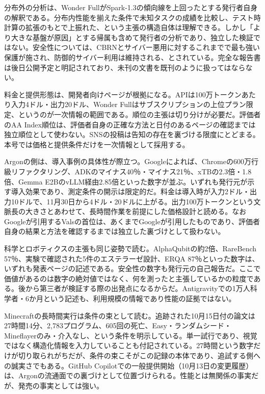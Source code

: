 \documentclass[lualatex,a4paper,10pt]{jlreq}
\begin{document}
分布外の分析は、Wonder FullがSpark-1.3の傾向線を上回ったとする発行者自身の解釈である。分布内性能を揃えた条件で未知タスクの成績を比較し、テスト時計算の拡張のもとで上振れた、という主張の構造自体は理解できる。しかし「より大きな基盤が原因」とする帰属も含めて発行者の分析であり、独立した検証ではない。安全性については、CBRNとサイバー悪用に対するこれまでで最も強い保護が施され、防御的サイバー利用は維持される、とされている。完全な報告書は後日公開予定と明記されており、未刊の文書を既刊のように扱ってはならない。

料金と提供形態は、開発者向けページが根拠になる。APIは100万トークンあたり入力4ドル・出力20ドル、Wonder Fullはサブスクリプションの上位プラン限定、というのが一次情報の範囲である。順位の主張は切り分けが必要だ。評価者のAA Index順位は、評価者自身の正確な方法と日付のあるページの確認までは独立順位として使わない。SNSの投稿は告知の存在を裏づける限度にとどまる。本号では価格と提供条件だけを一次情報として採用する。

Argonの側は、導入事例の具体性が際立つ。Googleによれば、Chromeの600万行級リファクタリング、ADKのマイナス40％・マイナス21％、xTBの2.3倍・1.8倍、Gemma E2BのvLLM経由2.85倍といった数字が並ぶ。いずれも発行元が示す導入効果であり、測定条件の開示は限定的だ。料金は導入時が入力2ドル・出力10ドルで、11月30日から4ドル・20ドルに上がる。出力100万トークンという文脈長の大きさとあわせて、長時間作業を前提にした価格設計と読める。なおGoogleが引用するValsの首位は、あくまでGoogleが引用したものであり、評価者自身の結果と方法を確認するまでは独立した裏づけとして扱わない。

科学とロボティクスの主張も同じ姿勢で読む。AlphaQubitの約2倍、RareBench 57％、実験で確認された5件のエステラーゼ設計、ERQA 87％といった数字は、いずれも発表ページの記述である。安全性の数字も発行元の自己報告だ。ここで価値があるのは数字の絶対値ではなく、何を測ったと主張しているかの粒度である。後から第三者が検証する際の出発点になるからだ。Antigravityでの1万人科学者・6か月という記述も、利用規模の情報であり性能の証拠ではない。

Minecraftの長時間実行は条件の束として読む。追跡された10月15日付の論文は27時間14分、2,783プログラム、605回の死亡、Easy・ランダムシード・Mineflayerのみ・介入なし、という条件を明示している。単一試行であり、視覚ではなく構造化情報を入力していることも付記されている。27時間という数字だけが切り取られがちだが、条件の束こそがこの記録の本体であり、追試する側への誠実さでもある。GitHub Copilotでの一般提供開始（10月13日の変更履歴）は、Argonの流通面での裏づけとして位置づけられる。性能とは無関係の事実だが、発売の事実としては強い。
\end{document}
